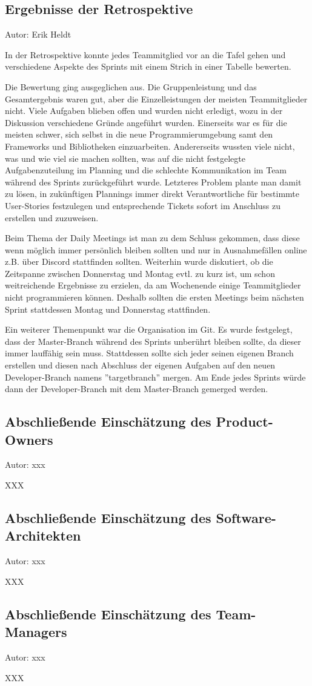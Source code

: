 \subsection{Ergebnisse der Retrospektive}
{\small Autor: Erik Heldt}

In der Retrospektive konnte jedes Teammitglied vor an die Tafel gehen und verschiedene Aspekte des Sprints mit einem Strich in einer Tabelle bewerten.

Die Bewertung ging ausgeglichen aus. Die Gruppenleistung und das Gesamtergebnis waren gut, aber die Einzelleistungen der meisten Teammitglieder nicht. Viele Aufgaben blieben offen und wurden nicht erledigt, wozu in der Diskussion verschiedene Gründe angeführt wurden. Einerseits war es für die meisten schwer, sich selbst in die neue Programmierumgebung samt den Frameworks und Bibliotheken einzuarbeiten. Andererseits wussten viele nicht, was und wie viel sie machen sollten, was auf die nicht festgelegte Aufgabenzuteilung im Planning und die schlechte Kommunikation im Team während des Sprints zurückgeführt wurde. Letzteres Problem plante man damit zu lösen, in zukünftigen Plannings immer direkt Verantwortliche für bestimmte User-Stories festzulegen und entsprechende Tickets sofort im Anschluss zu erstellen und zuzuweisen.

Beim Thema der Daily Meetings ist man zu dem Schluss gekommen, dass diese wenn möglich immer persönlich bleiben sollten und nur in Ausnahmefällen online z.B. über Discord stattfinden sollten. Weiterhin wurde diskutiert, ob die Zeitspanne zwischen Donnerstag und Montag evtl. zu kurz ist, um schon weitreichende Ergebnisse zu erzielen, da am Wochenende einige Teammitglieder nicht programmieren können. Deshalb sollten die ersten Meetings beim nächsten Sprint stattdessen Montag und Donnerstag stattfinden.

Ein weiterer Themenpunkt war die Organisation im Git. Es wurde festgelegt, dass der Master-Branch während des Sprints unberührt bleiben sollte, da dieser immer lauffähig sein muss. Stattdessen sollte sich jeder seinen eigenen Branch erstellen und diesen nach Abschluss der eigenen Aufgaben auf den neuen Developer-Branch namens ''targetbranch'' mergen. Am Ende jedes Sprints würde dann der Developer-Branch mit dem Master-Branch gemerged werden.

\subsection{Abschließende Einschätzung des Product-Owners}
{\small Autor: xxx}

XXX

\subsection{Abschließende Einschätzung des Software-Architekten}
{\small Autor: xxx}

XXX

\subsection{Abschließende Einschätzung des Team-Managers}
{\small Autor: xxx}

XXX
